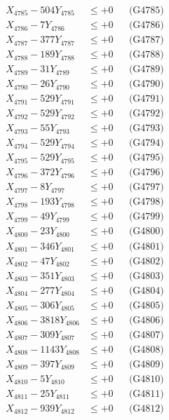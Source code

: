 \documentclass[a4paper,10pt]{article}
\begin{document}
{\begin{align}
X_{4785} - 504Y_{4785} &\leq +0 && \text{(G4785)} \\
X_{4786} - 7Y_{4786} &\leq +0 && \text{(G4786)} \\
X_{4787} - 377Y_{4787} &\leq +0 && \text{(G4787)} \\
X_{4788} - 189Y_{4788} &\leq +0 && \text{(G4788)} \\
X_{4789} - 31Y_{4789} &\leq +0 && \text{(G4789)} \\
X_{4790} - 26Y_{4790} &\leq +0 && \text{(G4790)} \\
\allowbreak
X_{4791} - 529Y_{4791} &\leq +0 && \text{(G4791)} \\
X_{4792} - 529Y_{4792} &\leq +0 && \text{(G4792)} \\
X_{4793} - 55Y_{4793} &\leq +0 && \text{(G4793)} \\
X_{4794} - 529Y_{4794} &\leq +0 && \text{(G4794)} \\
X_{4795} - 529Y_{4795} &\leq +0 && \text{(G4795)} \\
X_{4796} - 372Y_{4796} &\leq +0 && \text{(G4796)} \\
X_{4797} - 8Y_{4797} &\leq +0 && \text{(G4797)} \\
X_{4798} - 193Y_{4798} &\leq +0 && \text{(G4798)} \\
X_{4799} - 49Y_{4799} &\leq +0 && \text{(G4799)} \\
X_{4800} - 23Y_{4800} &\leq +0 && \text{(G4800)} \\
\allowbreak
X_{4801} - 346Y_{4801} &\leq +0 && \text{(G4801)} \\
X_{4802} - 47Y_{4802} &\leq +0 && \text{(G4802)} \\
X_{4803} - 351Y_{4803} &\leq +0 && \text{(G4803)} \\
X_{4804} - 277Y_{4804} &\leq +0 && \text{(G4804)} \\
X_{4805} - 306Y_{4805} &\leq +0 && \text{(G4805)} \\
X_{4806} - 3818Y_{4806} &\leq +0 && \text{(G4806)} \\
X_{4807} - 309Y_{4807} &\leq +0 && \text{(G4807)} \\
X_{4808} - 1143Y_{4808} &\leq +0 && \text{(G4808)} \\
X_{4809} - 397Y_{4809} &\leq +0 && \text{(G4809)} \\
X_{4810} - 5Y_{4810} &\leq +0 && \text{(G4810)} \\
\allowbreak
X_{4811} - 25Y_{4811} &\leq +0 && \text{(G4811)} \\
X_{4812} - 939Y_{4812} &\leq +0 && \text{(G4812)} \\

\end{align}}
\end{document}
